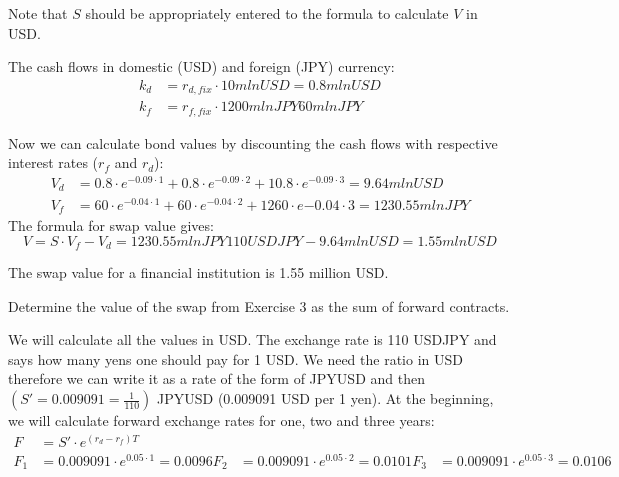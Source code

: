 \documentclass[12pt,a4paper]{exam}
\begin{document}
\begin{questions}
\begin{solution}
Note that $S$ should be appropriately entered to the formula to calculate $V$ in USD.

The cash flows in domestic (USD) and foreign (JPY) currency:
\begin{equation*}
\begin{aligned}
k_d&=r_{d, fix}\cdot 10 mln USD =0.8 mln USD \\
k_f&=r_{f, fix}\cdot 1200 mln JPY 60 mln JPY
\end{aligned}
\end{equation*}

Now we can calculate bond values by discounting the cash flows with respective interest rates ($r_f$ and $r_d$):
\begin{equation*}
\begin{aligned}
V_d&=0.8\cdot e^{-0.09\cdot1}+0.8\cdot e^{-0.09\cdot2}+10.8\cdot e^{-0.09\cdot 3}=9.64 mln USD\\
V_f&=60\cdot e^{-0.04\cdot1}+60\cdot e^{-0.04\cdot 2}+1260\cdot e{-0.04\cdot 3}=1230.55 mln JPY
\end{aligned}
\end{equation*}
The formula for swap value gives:
\begin{equation*}
V = S\cdot V_f - V_d =1230.55 mln JPY110 USDJPY-9.64 mln USD=1.55 mln USD
\end{equation*}

The swap value for a financial institution is 1.55 million USD.
\end{solution}

\question Determine the value of the swap from Exercise 3 as the sum of forward contracts.

\begin{solution}
We will calculate all the values in USD. The exchange rate is 110 USDJPY and says how many yens one should pay for 1 USD. We need the ratio in USD therefore we can write it as a rate of the form of JPYUSD and then $(S'=0.009091=\frac{1}{110})$ JPYUSD (0.009091 USD per 1 yen). At the beginning, we will calculate forward exchange rates for one, two and three years:
\begin{equation*}
\begin{aligned}
F&=S'\cdot e^{(r_d-r_f)T}\\
F_1&=0.009091\cdot e^{0.05\cdot 1}=0.0096
F_2&=0.009091\cdot e^{0.05\cdot 2}=0.0101
F_3&=0.009091\cdot e^{0.05\cdot 3}=0.0106
\end{aligned}
\end{equation*}


\end{solution}
\end{questions}
\end{document}
